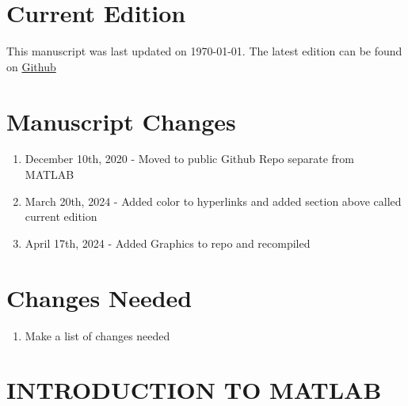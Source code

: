 \documentclass{book}
\begin{document}


\section*{Current Edition}

This manuscript was last updated on \today. 
The latest edition can be found on \href{https://github.com/cmontalvo251/LaTeX/blob/master/Numerical_Methods_Montalvo/Numerical_Methods.pdf}{Github}

\section*{Manuscript Changes}

\begin{enumerate}[itemsep=-5pt]
\item December 10th, 2020 - Moved to public Github Repo separate from MATLAB
\item March 20th, 2024 - Added color to hyperlinks and added section above called current edition
\item April 17th, 2024 - Added Graphics to repo and recompiled 
\end{enumerate}

\section*{Changes Needed}

\begin{enumerate}[itemsep=-5pt]
  \item Make a list of changes needed
\end{enumerate}

\newpage

\tableofcontents

%

%

%

%


\section{INTRODUCTION TO MATLAB}






\end{document}

